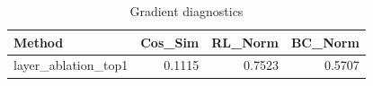 \begin{table}[htbp]
\centering
\caption{Gradient diagnostics}
\label{tab:grad-diag}
\begin{tabular}{lrrr}
\toprule
\textbf{Method} & \textbf{Cos\_Sim} & \textbf{RL\_Norm} & \textbf{BC\_Norm} \\
\midrule
layer\_ablation\_top1 & 0.1115 & 0.7523 & 0.5707 \\
\bottomrule
\end{tabular}
\end{table}
